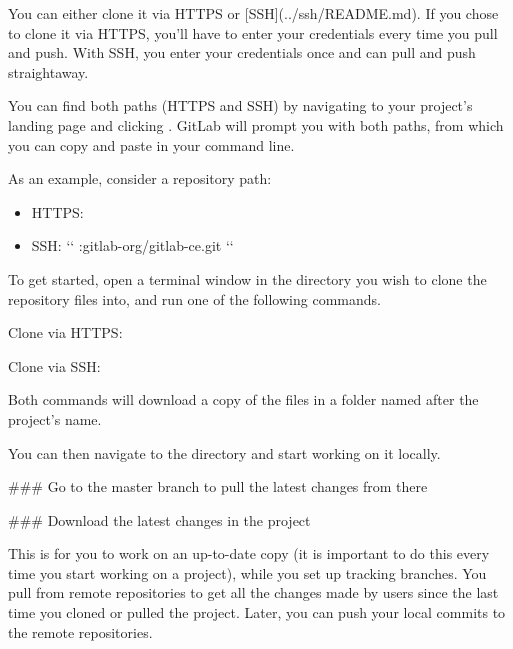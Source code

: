 \documentclass[a4paper,11pt,english]{sphinxmanual}
\begin{document}
You can either clone it via HTTPS or {[}SSH{]}(../ssh/README.md).
If you chose to clone it via HTTPS, you’ll have to enter your
credentials every time you pull and push. With SSH, you enter
your credentials once and can pull and push straightaway.

You can find both paths (HTTPS and SSH) by navigating to
your project’s landing page and clicking . GitLab
will prompt you with both paths, from which you can copy
and paste in your command line.

As an example, consider a repository path:
\begin{itemize}
\item {} 
HTTPS: 

\item {} 
SSH: {}`{}` :gitlab-org/gitlab-ce.git {}`{}`

\end{itemize}

To get started, open a terminal window in the directory
you wish to clone the repository files into, and run one
of the following commands.

Clone via HTTPS:


Clone via SSH:


Both commands will download a copy of the files in a
folder named after the project’s name.

You can then navigate to the directory and start working
on it locally.

\#\#\# Go to the master branch to pull the latest changes from there


\#\#\# Download the latest changes in the project

This is for you to work on an up-to-date copy (it is important to do this every time you start working on a project), while you set up tracking branches. You pull from remote repositories to get all the changes made by users since the last time you cloned or pulled the project. Later, you can push your local commits to the remote repositories.

\end{document}

